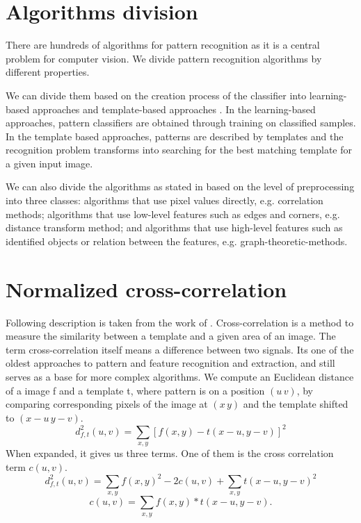 \section{Algorithms division}
There are hundreds of algorithms for pattern recognition as it is a central problem for computer vision. We divide pattern recognition algorithms by different properties.

We can divide them based on the creation process of the classifier into learning-based approaches and template-based approaches \cite{skeletonMatching}. In the learning-based approaches, pattern classifiers are obtained through training on classified samples. In the template based approaches, patterns are described by templates and the recognition problem transforms into searching for the best matching template for a given input image.

We can also divide the algorithms as stated in \cite{distanceTransform} based on the level of preprocessing into three classes: algorithms that use pixel values directly, e.g. correlation methods; algorithms that use low-level features such as edges and corners, e.g. distance transform method; and algorithms that use high-level features such as identified objects or relation between the features, e.g. graph-theoretic-methods.

\section{Normalized cross-correlation}
Following description is taken from the work of \cite{crossCorrLewis}.
Cross-correlation is a method to measure the similarity between a template and a given area of an image. The term cross-correlation itself means a difference between two signals. Its one of the oldest approaches to pattern and feature recognition and extraction, and still serves as a base for more complex algorithms.
We compute an Euclidean distance of a image f and a template t, where pattern is on a position $(u\,v)$, by comparing corresponding pixels of the image at $(x\,y)$ and the template shifted to $(x-u\,y-v)$. 
\begin{equation*}
d_{f,t}^{2}(u,v)=\sum_{x,y} [ f(x,y) - t(x-u, y-v) ]^{2} 
\end{equation*}
When expanded, it gives us three terms. One of them is the cross correlation term $c(u,v)$.
\begin{equation*}
d_{f,t}^{2}(u,v)=\sum_{x,y} f(x,y)^{2} - 2c(u,v) + \sum_{x,y} t(x-u, y-v)^2
\end{equation*}
\begin{equation*}
c(u,v)=\sum_{x,y} f(x,y) * t(x-u, y-v).
\end{equation*}

